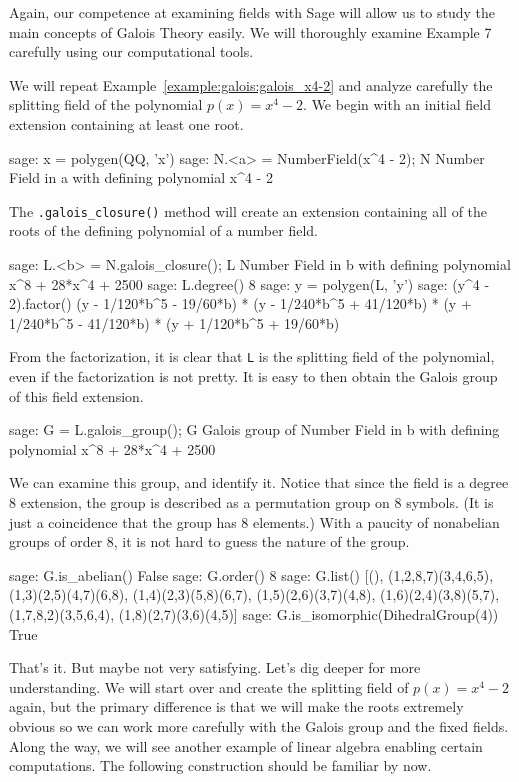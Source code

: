 Again, our competence at examining fields with Sage will allow us to study the main concepts of Galois Theory easily.  We will thoroughly examine Example 7 carefully using our computational tools.\par
%
%
We will repeat Example~\ref{example:galois:galois_x4-2} and analyze carefully the splitting field of the polynomial $p(x)=x^4-2$.  We begin with an initial field extension containing at least one root.
%
\begin{sageexample}
sage: x = polygen(QQ, 'x')
sage: N.<a> = NumberField(x^4 - 2); N
Number Field in a with defining polynomial x^4 - 2
\end{sageexample}
%
The \verb?.galois_closure()? method will create an extension containing all of the roots of the defining polynomial of a number field.
%
\begin{sageexample}
sage: L.<b> = N.galois_closure(); L
Number Field in b with defining polynomial x^8 + 28*x^4 + 2500
sage: L.degree()
8
sage: y = polygen(L, 'y')
sage: (y^4 - 2).factor()
(y - 1/120*b^5 -  19/60*b) *
(y - 1/240*b^5 + 41/120*b) *
(y + 1/240*b^5 - 41/120*b) *
(y + 1/120*b^5 +  19/60*b)
\end{sageexample}
%
From the factorization, it is clear that \verb?L? is the splitting field of the polynomial, even if the factorization is not pretty.  It is easy to then obtain the Galois group of this field extension.
%
\begin{sageexample}
sage: G = L.galois_group(); G
Galois group of Number Field in b with
defining polynomial x^8 + 28*x^4 + 2500
\end{sageexample}
%
We can examine this group, and identify it.  Notice that since the field is a degree 8 extension, the group is described as a permutation group on 8 symbols.  (It is just a coincidence that the group has 8 elements.)  With a paucity of nonabelian groups of order 8, it is not hard to guess the nature of the group.
%
\begin{sageexample}
sage: G.is_abelian()
False
sage: G.order()
8
sage: G.list()
[(), (1,2,8,7)(3,4,6,5),
(1,3)(2,5)(4,7)(6,8), (1,4)(2,3)(5,8)(6,7),
(1,5)(2,6)(3,7)(4,8), (1,6)(2,4)(3,8)(5,7),
(1,7,8,2)(3,5,6,4), (1,8)(2,7)(3,6)(4,5)]
sage: G.is_isomorphic(DihedralGroup(4))
True
\end{sageexample}
%
That's it.  But maybe not very satisfying.  Let's dig deeper for more understanding.  We will start over and create the splitting field of $p(x)=x^4-2$ again, but the primary difference is that we will make the roots extremely obvious so we can work more carefully with the Galois group and the fixed fields.  Along the way, we will see another example of linear algebra enabling certain computations.  The following construction should be familiar by now.
